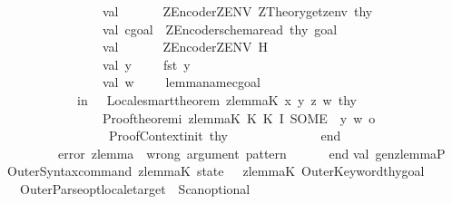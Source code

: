 \begin{isabellebody}
\ \ \ \ \ \ \ \ \ \ \ \ \ \ \ \ \ val\ {\isacharunderscore}\ \ \ \ \ {\isacharequal}\ {\isacharparenleft}ZEncoder{\isachardot}ZENV{\isacharcolon}{\isacharequal}\ ZTheory{\isachardot}get{\isacharunderscore}zenv\ thy{\isacharparenright}\isanewline
\ \ \ \ \ \ \ \ \ \ \ \ \ \ \ \ \ val\ cgoal\ {\isacharequal}\ {\isacharparenleft}ZEncoder{\isachardot}schema{\isacharunderscore}read\ thy\ goal{\isacharparenright}\isanewline
\ \ \ \ \ \ \ \ \ \ \ \ \ \ \ \ \ val\ {\isacharunderscore}\ \ \ \ \ {\isacharequal}\ {\isacharparenleft}ZEncoder{\isachardot}ZENV{\isacharcolon}{\isacharequal}\ H\ {\isacharparenright}\isanewline
\ \ \ \ \ \ \ \ \ \ \ \ \ \ \ \ \ val\ y{\isacharprime}\ \ \ \ {\isacharequal}\ {\isacharparenleft}fst\ y{\isacharcomma}{\isacharbrackleft}{\isacharbrackright}{\isacharparenright}\isanewline
\ \ \ \ \ \ \ \ \ \ \ \ \ \ \ \ \ val\ w{\isacharprime}\ \ \ \ {\isacharequal}\ {\isacharbrackleft}{\isacharparenleft}{\isacharparenleft}lemma{\isacharunderscore}name{\isacharcomma}{\isacharbrackleft}{\isacharbrackright}{\isacharparenright}{\isacharcomma}{\isacharbrackleft}{\isacharparenleft}cgoal{\isacharcomma}{\isacharparenleft}{\isacharbrackleft}{\isacharbrackright}{\isacharcomma}{\isacharbrackleft}{\isacharbrackright}{\isacharparenright}{\isacharparenright}{\isacharbrackright}{\isacharparenright}{\isacharbrackright}\isanewline
\ \ \ \ \ \ \ \ \ \ \ \ \ in\ \ {\isacharparenleft}{\isacharasterisk}\ Locale{\isachardot}smart{\isacharunderscore}theorem\ zlemmaK\ x\ y\ z\ w\ thy\ {\isacharasterisk}{\isacharparenright}\ \isanewline
\ \ \ \ \ \ \ \ \ \ \ \ \ \ \ \ \ {\isacharparenleft}Proof{\isachardot}theorem{\isacharunderscore}i\ zlemmaK\ {\isacharparenleft}K\ {\isacharparenleft}K\ I{\isacharparenright}{\isacharparenright}\ {\isacharparenleft}SOME\ {\isachardoublequote}{\isachardoublequote}{\isacharparenright}\ y{\isacharprime}\ w{\isacharprime}\ o\ \isanewline
\ \ \ \ \ \ \ \ \ \ \ \ \ \ \ \ \ \ ProofContext{\isachardot}init{\isacharparenright}\ thy\ \isanewline
\ \ \ \ \ \ \ \ \ \ \ \ \ end\isanewline
\ \ \ \ \ \ \ {\isacharbar}\ {\isacharunderscore}\ {\isacharequal}{\isachargreater}\ error\ {\isachardoublequote}zlemma\ {\isacharcolon}\ wrong\ argument\ pattern\ {\isacharbang}{\isachardoublequote}\ \isanewline
\ \ \ \ end{\isacharsemicolon}\isanewline
\isanewline
val\ gen{\isacharunderscore}zlemmaP\ {\isacharequal}\isanewline
\ \ OuterSyntax{\isachardot}command\ zlemmaK\ {\isacharparenleft}{\isachardoublequote}state\ {\isachardoublequote}\ {\isacharcircum}\ zlemmaK{\isacharparenright}\ OuterKeyword{\isachardot}thy{\isacharunderscore}goal\isanewline
\ \ \ \ {\isacharparenleft}OuterParse{\isachardot}opt{\isacharunderscore}locale{\isacharunderscore}target\ {\isacharminus}{\isacharminus}\ Scan{\isachardot}optional\ \isanewline

\end{isabellebody}
